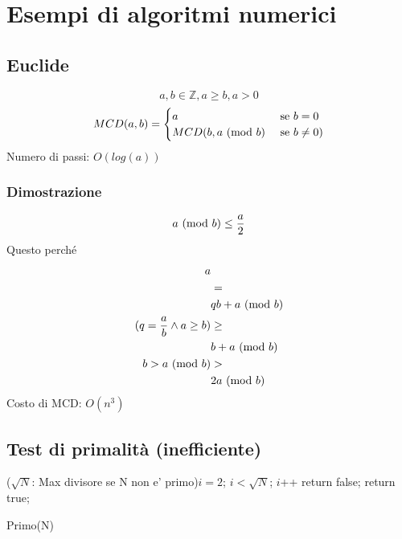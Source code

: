 \chapter{Esempi di algoritmi numerici}
\section{Euclide}
\[ a,b \in \mathbb{Z}, a \geq b, a > 0 \]
\begin{equation*}
    MCD(a,b) =
    \begin{cases}
        a &\text{ se } b=0\\
        MCD(b, a\ (\mathrm{mod}\ b) &\text{ se } b\neq0)
    \end{cases}
\end{equation*}
Numero di passi: $O(log(a))$
\subsection{Dimostrazione}
\[ a\ (\mathrm{mod}\ b) \leq \dfrac{a}{2} \]
Questo perché
\begin{equation*}
    \begin{split}
        a &\\
        & =\\
        & qb + a\ (\mathrm{mod}\ b)\\
        (q = \dfrac{a}{b} \wedge a \geq b) & \geq\\
        & b + a\ (\mathrm{mod}\ b)\\
        b > a\ (\mathrm{mod}\ b) & >\\
        & 2a\ (\mathrm{mod}\ b)
    \end{split}
\end{equation*}
Costo di MCD: $O(n^3)$
\newpage
\section{Test di primalità (inefficiente)}
\begin{algorithm*}
    \For($\sqrt{N}$: Max divisore se N non e' primo){$i=2$; $i < \sqrt{N}$; $i$++} {
         {
            return false;
        }
    }
    return true;
    \caption{Primo(N)}
\end{algorithm*}